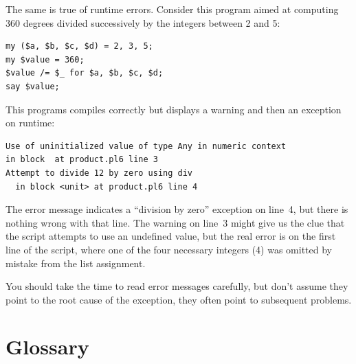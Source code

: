 
The same is true of runtime errors. Consider this program aimed at computing 360 degrees divided successively by the integers between 2 and 5:

\begin{verbatim}
my ($a, $b, $c, $d) = 2, 3, 5;
my $value = 360;
$value /= $_ for $a, $b, $c, $d;
say $value;
\end{verbatim}

This programs compiles correctly but displays a warning and 
then an exception on runtime:

\begin{verbatim}
Use of uninitialized value of type Any in numeric context 
in block  at product.pl6 line 3
Attempt to divide 12 by zero using div
  in block <unit> at product.pl6 line 4
\end{verbatim}
%

The error message indicates a ``division by zero'' exception 
on line~4, but there is nothing wrong with that line. 
The warning on line~3 might give us the clue that the 
script attempts to use an undefined value, but the real error 
is on the first line of the script, where one of the four 
necessary integers (4) was omitted by mistake from the list 
assignment.


You should take the time to read error messages carefully, 
but don't assume they point to the root cause of the 
exception, they often point to subsequent problems.


\section{Glossary}


